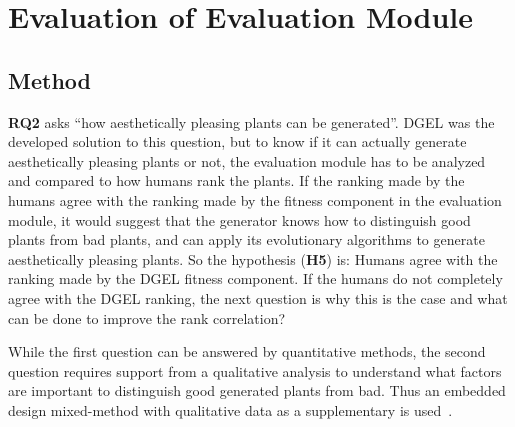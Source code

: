 \section{Evaluation of Evaluation Module}
\subsection{Method}
\textbf{RQ2} asks ``how aesthetically pleasing plants can be generated''.
\gls{DGEL} was the developed solution to this question, but to know if it can actually generate aesthetically pleasing plants or not, the evaluation module has to be analyzed and compared to how humans rank the plants.
If the ranking made by the humans agree with the ranking made by the fitness component in the evaluation module, it would suggest that the generator knows how to distinguish good plants from bad plants, and can apply its evolutionary algorithms to generate aesthetically pleasing plants.
So the hypothesis (\textbf{H5}) is: Humans agree with the ranking made by the \gls{DGEL} fitness component.
If the humans do not completely agree with the \gls{DGEL} ranking, the next question is why this is the case and what can be done to improve the rank correlation?

While the first question can be answered by quantitative methods, the second question requires support from a qualitative analysis to understand what factors are important to distinguish good generated plants from bad.
Thus an embedded design mixed-method with qualitative data as a supplementary is used~\cite{PracticalResearch}.

